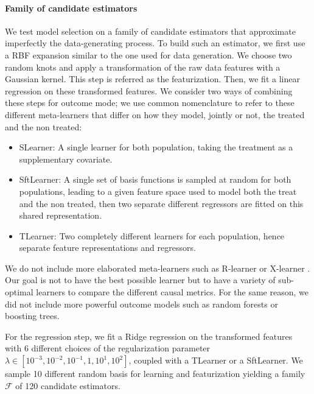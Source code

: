 \documentclass[french,12pt,twoside,a4paper]{book}
\begin{document}
\paragraph{Family of candidate estimators}

We test model selection on a family of candidate estimators that
approximate imperfectly the data-generating process. To build such an
estimator, we first use a RBF expansion
similar to the one used for data generation.
We choose two random knots and apply a transformation of the raw data features
with a Gaussian kernel. This step
is referred as the featurization. Then, we fit a linear regression on
these
transformed features. We consider two ways of combining these steps for outcome
mode; we use common nomenclature \citep{kunzel_metalearners_2019,shen2023rctrep} to refer
to these different meta-learners that differ on how
they model, jointly or not, the treated and the non treated:
\begin{itemize}
  \item SLearner: A single learner for both population, taking the treatment as
        a supplementary covariate.

  \item SftLearner: A single set of basis functions is sampled at random for both
        populations, leading to a given feature space used to model both the treat and
        the non treated, then two
        separate different regressors are fitted on this shared representation.
  \item TLearner: Two completely different learners for each population, hence
        separate feature representations and regressors.
\end{itemize}

We do not include more elaborated meta-learners such as R-learner
\citep{nie_quasioracle_2017} or X-learner
\citep{kunzel_metalearners_2019}. Our goal is not to have the best possible
learner but to have a variety of sub-optimal learners to compare the
different causal metrics. For the same reason, we did not include more powerful
outcome models such as random forests or boosting trees.

For the regression step, we fit a Ridge regression on the transformed features
with 6 different choices of the regularization parameter $\lambda \in [10^{-3},
    10^{-2}, 10^{-1}, 1, 10^{1}, 10^{2}]$, coupled with a TLearner or a SftLearner.
We sample 10 different random basis for learning and
featurization yielding a family $\mathcal F$ of 120 candidate estimators.
%
\end{document}
